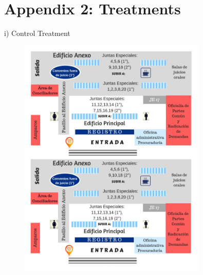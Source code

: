 \section*{Appendix 2: Treatments}

i) Control Treatment
\begin{figure}[H] 
    \centering
    \includegraphics[width=0.8\textwidth]{Figures/A2_controlTreatment.jpg}
    \label{fig:A2_1}
\end{figure}
